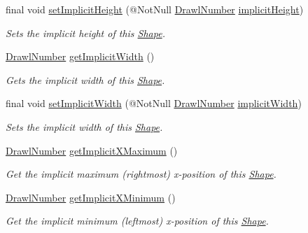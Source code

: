\begin{DoxyCompactItemize}
final void \hyperlink{classcom_1_1aarrelaakso_1_1drawl_1_1_shape_a01a28173688c7c955b0c7558ac3ff5df}{set\+Implicit\+Height} (@Not\+Null \hyperlink{classcom_1_1aarrelaakso_1_1drawl_1_1_drawl_number}{Drawl\+Number} \hyperlink{classcom_1_1aarrelaakso_1_1drawl_1_1_shape_af2f5b1d81ce2cdabc8b18dfb029f413b}{implicit\+Height})
\begin{DoxyCompactList}\small\item\em Sets the implicit height of this \hyperlink{classcom_1_1aarrelaakso_1_1drawl_1_1_shape}{Shape}. \end{DoxyCompactList}\item 
\hyperlink{classcom_1_1aarrelaakso_1_1drawl_1_1_drawl_number}{Drawl\+Number} \hyperlink{classcom_1_1aarrelaakso_1_1drawl_1_1_shape_af7ebce58a8dbba0cbe372040b74d7fca}{get\+Implicit\+Width} ()
\begin{DoxyCompactList}\small\item\em Gets the implicit width of this \hyperlink{classcom_1_1aarrelaakso_1_1drawl_1_1_shape}{Shape}. \end{DoxyCompactList}\item 
final void \hyperlink{classcom_1_1aarrelaakso_1_1drawl_1_1_shape_ac513970aed7ea7faa1de7efa35d7d068}{set\+Implicit\+Width} (@Not\+Null \hyperlink{classcom_1_1aarrelaakso_1_1drawl_1_1_drawl_number}{Drawl\+Number} \hyperlink{classcom_1_1aarrelaakso_1_1drawl_1_1_shape_a00c6b870d70449a79a000a3374ae041c}{implicit\+Width})
\begin{DoxyCompactList}\small\item\em Sets the implicit width of this \hyperlink{classcom_1_1aarrelaakso_1_1drawl_1_1_shape}{Shape}. \end{DoxyCompactList}\item 
\hyperlink{classcom_1_1aarrelaakso_1_1drawl_1_1_drawl_number}{Drawl\+Number} \hyperlink{classcom_1_1aarrelaakso_1_1drawl_1_1_shape_ae1820c7d674c6c022b72cc086005131f}{get\+Implicit\+X\+Maximum} ()
\begin{DoxyCompactList}\small\item\em Get the implicit maximum (rightmost) x-\/position of this \hyperlink{classcom_1_1aarrelaakso_1_1drawl_1_1_shape}{Shape}. \end{DoxyCompactList}\item 
\hyperlink{classcom_1_1aarrelaakso_1_1drawl_1_1_drawl_number}{Drawl\+Number} \hyperlink{classcom_1_1aarrelaakso_1_1drawl_1_1_shape_a43b7aaf82c47e231b57622b0346d3ce1}{get\+Implicit\+X\+Minimum} ()
\begin{DoxyCompactList}\small\item\em Get the implicit minimum (leftmost) x-\/position of this \hyperlink{classcom_1_1aarrelaakso_1_1drawl_1_1_shape}{Shape}. \end{DoxyCompactList}\item 

\end{DoxyCompactItemize}
